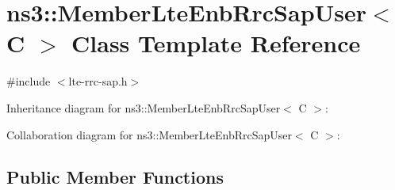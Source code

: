 \hypertarget{classns3_1_1MemberLteEnbRrcSapUser}{}\section{ns3\+:\+:Member\+Lte\+Enb\+Rrc\+Sap\+User$<$ C $>$ Class Template Reference}
\label{classns3_1_1MemberLteEnbRrcSapUser}


{\ttfamily \#include $<$lte-\/rrc-\/sap.\+h$>$}



Inheritance diagram for ns3\+:\+:Member\+Lte\+Enb\+Rrc\+Sap\+User$<$ C $>$\+:


Collaboration diagram for ns3\+:\+:Member\+Lte\+Enb\+Rrc\+Sap\+User$<$ C $>$\+:
\subsection*{Public Member Functions}

